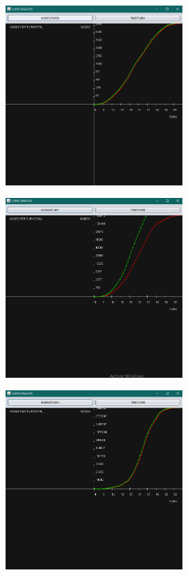 \begin{figure}[!ht]
\begin{center}
\includegraphics[width=0.60\textwidth]{./NODESPERTURN1}
\end{center}
\end{figure}

\begin{figure}[!ht]
\begin{center}
\includegraphics[width=0.60\textwidth]{./NODESPERTURN2}
\end{center}
\end{figure}
\newpage

\begin{figure}[!ht]
\begin{center}
\includegraphics[width=0.60\textwidth]{./NODESPERTURN3}
\end{center}
\end{figure}

